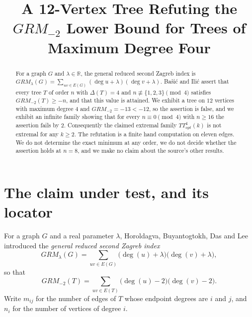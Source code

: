 \documentclass[11pt]{amsart}
\title[A tree refuting a $GRM_{-2}$ lower bound]{A 12-Vertex Tree Refuting the
\texorpdfstring{$GRM_{-2}$}{GRM(-2)} Lower Bound for Trees of Maximum Degree Four}
\date{}
\begin{document}
\begin{abstract}
For a graph $G$ and $\lambda\in\mathbb{R}$, the general reduced second Zagreb index is
$GRM_\lambda(G)=\sum_{uv\in E(G)}(\deg u+\lambda)(\deg v+\lambda)$. Ba\v{s}i\'{c} and
Ili\'{c} assert that every tree $T$ of order $n$ with $\Delta(T)=4$ and
$n\not\equiv\{1,2,3\}\pmod 4$ satisfies $GRM_{-2}(T)\ge -n$, and that this value is attained.
We exhibit a tree on $12$ vertices with maximum degree $4$ and $GRM_{-2}=-13<-12$, so the
assertion is false, and we exhibit an infinite family showing
that for every $n\equiv 0\pmod 4$ with $n\ge 16$ the assertion fails by $2$. Consequently the
claimed extremal family $TT^4_{opt}(k)$ is not extremal for any $k\ge 2$. The refutation is a
finite hand computation on eleven edges. We do not determine the exact minimum at any order,
we do not decide whether the assertion holds at $n=8$, and
we make no claim about the source's other results.
\end{abstract}

\maketitle

\section{The claim under test, and its locator}\label{sec:claim}

For a graph $G$ and a real parameter $\lambda$, Horoldagva, Buyantogtokh, Das and Lee
\cite{Horoldagva} introduced the \emph{general reduced second Zagreb index}
\begin{equation}\label{eq:def}
  GRM_\lambda(G)=\sum_{uv\in E(G)}\bigl(\deg(u)+\lambda\bigr)\bigl(\deg(v)+\lambda\bigr),
\end{equation}
so that
\begin{equation}\label{eq:grm2}
  GRM_{-2}(T)=\sum_{uv\in E(T)}\bigl(\deg(u)-2\bigr)\bigl(\deg(v)-2\bigr).
\end{equation}
Write $m_{ij}$ for the number of edges of $T$ whose endpoint degrees are $i$ and $j$, and
$n_i$ for the number of vertices of degree $i$.
\end{document}
